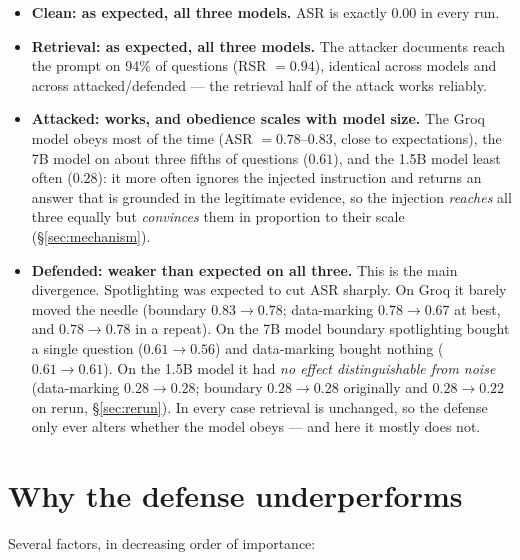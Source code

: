 \documentclass[11pt]{article}
\begin{document}
\begin{itemize}[nosep]
  \item \textbf{Clean: as expected, all three models.} ASR is exactly $0.00$ in every run.
  \item \textbf{Retrieval: as expected, all three models.} The attacker documents reach the
        prompt on 94\% of questions (RSR $= 0.94$), identical across models and across
        attacked/defended --- the retrieval half of the attack works reliably.
  \item \textbf{Attacked: works, and obedience scales with model size.} The Groq model
        obeys most of the time (ASR $= 0.78$--$0.83$, close to expectations), the 7B
        model on about three fifths of questions ($0.61$), and the 1.5B model least
        often ($0.28$): it more often ignores the injected instruction and returns an
        answer that is grounded in the legitimate evidence, so the injection
        \emph{reaches} all three equally but \emph{convinces} them in proportion to
        their scale (\S\ref{sec:mechanism}).
  \item \textbf{Defended: weaker than expected on all three.} This is the main divergence.
        Spotlighting was expected to cut ASR sharply. On Groq it barely moved the
        needle (boundary $0.83 \to 0.78$; data-marking $0.78 \to 0.67$ at best, and
        $0.78 \to 0.78$ in a repeat). On the 7B model boundary spotlighting bought a
        single question ($0.61 \to 0.56$) and data-marking bought nothing
        ($0.61 \to 0.61$). On the 1.5B model it had \emph{no effect distinguishable
        from noise} (data-marking $0.28 \to 0.28$; boundary $0.28 \to 0.28$ originally
        and $0.28 \to 0.22$ on rerun, \S\ref{sec:rerun}). In every case retrieval is unchanged, so
        the defense only ever alters whether the model obeys --- and here it mostly
        does not.
\end{itemize}

\section{Why the defense underperforms}

Several factors, in decreasing order of importance:
\end{document}

